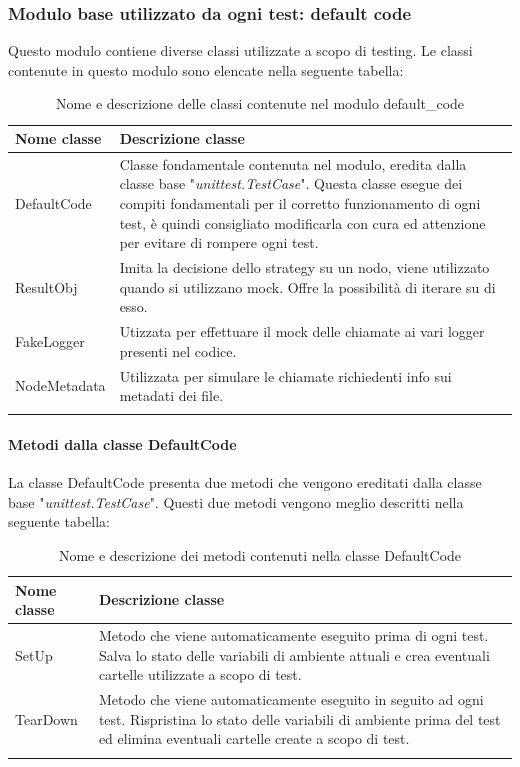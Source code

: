 \subsubsection{Modulo base utilizzato da ogni test: default code}
Questo modulo contiene diverse classi utilizzate a scopo di testing. Le classi contenute in questo modulo sono elencate nella seguente tabella:
{
	\setlength{\freewidth}{\dimexpr\textwidth-1\tabcolsep}
	\renewcommand{\arraystretch}{1.5}
	\setlength{\aboverulesep}{0pt}
	\setlength{\belowrulesep}{0pt}
	\begin{longtable}{L{.15\freewidth} L{.85\freewidth}}
		\textbf{Nome classe} & \textbf{Descrizione classe}\\
		\toprule
		\endhead	
		DefaultCode & Classe fondamentale contenuta nel modulo, eredita dalla classe base "\textit{unittest.TestCase}". Questa classe esegue dei compiti fondamentali per il corretto funzionamento di ogni test, è quindi consigliato modificarla con cura ed attenzione per evitare di rompere ogni test.\\
		ResultObj & Imita la decisione dello strategy su un nodo, viene utilizzato quando si utilizzano mock. Offre la possibilità di iterare su di esso. \\
		FakeLogger & Utizzata per effettuare il mock delle chiamate ai vari logger presenti nel codice. \\
		NodeMetadata &  Utilizzata per simulare le chiamate richiedenti info sui metadati dei file.\\
		\bottomrule
		\hiderowcolors
		\caption{Nome e descrizione delle classi contenute nel modulo default\_code}
	\end{longtable}
}

\paragraph{Metodi dalla classe DefaultCode}
La classe DefaultCode presenta due metodi che vengono ereditati dalla classe base "\textit{unittest.TestCase}". Questi due metodi vengono meglio descritti nella seguente tabella:

{
	\setlength{\freewidth}{\dimexpr\textwidth-1\tabcolsep}
	\renewcommand{\arraystretch}{1.5}
	\setlength{\aboverulesep}{0pt}
	\setlength{\belowrulesep}{0pt}
	\begin{longtable}{L{.15\freewidth} L{.85\freewidth}}
		\textbf{Nome classe} & \textbf{Descrizione classe}\\
		\toprule
		\endhead	
		SetUp & Metodo che viene automaticamente eseguito prima di ogni test. Salva lo stato delle variabili di ambiente attuali e crea eventuali cartelle utilizzate a scopo di test.\\
		TearDown & Metodo che viene automaticamente eseguito in seguito ad ogni test. Rispristina lo stato delle variabili di ambiente prima del test ed elimina eventuali cartelle create a scopo di test.\\
		\bottomrule
		\hiderowcolors
		\caption{Nome e descrizione dei metodi contenuti nella classe DefaultCode}
	\end{longtable}
}
 